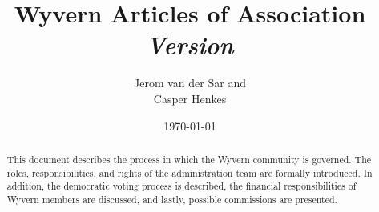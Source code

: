 \documentclass[a4paper]{article}
\title{
    Wyvern Articles of Association\\
    \vspace{10px}
    \large \textit{Version \versionnumber}
}
\author{
    Jerom van der Sar and\\
    Casper Henkes
}
\date{\today}
\begin{document}
\begin{titlepage}
    \maketitle
    \begin{abstract}
        This document describes the process in which the Wyvern community is governed. The roles, responsibilities, and rights of the administration team are formally introduced. In addition, the democratic voting process is described, the financial responsibilities of Wyvern members are discussed, and lastly, possible commissions are presented.
    \end{abstract}
\end{titlepage}






\end{document}
